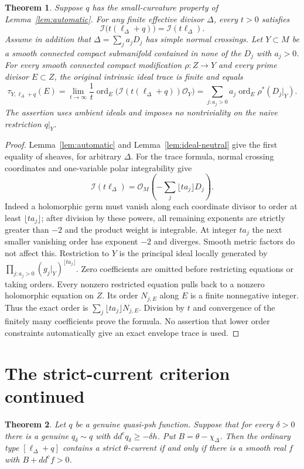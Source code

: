 \documentclass[11pt]{article}
\newtheorem{theorem}{Theorem}
\theoremstyle{remark}
\newcommand{\ddc}{dd^{\mathrm c}}
\begin{document}
\begin{theorem}\label{thm:intrinsic-trace}
Suppose $q$ has the small-curvature property of Lemma~\ref{lem:automatic}.
For any finite effective divisor $\Delta$, every $t>0$ satisfies
\[
 \mathcal I\bigl(t(\ell_\Delta+q)\bigr)
       =\mathcal I(t\ell_\Delta).
\]
Assume in addition that $\Delta=\sum_j a_jD_j$ has simple normal crossings.
Let $Y\subset M$ be a smooth connected compact submanifold contained in
none of the $D_j$ with $a_j>0$. For every smooth connected compact
modification $\rho:Z\to Y$ and every prime divisor $E\subset Z$, the
original intrinsic ideal trace is finite and equals
\[
 \tau_{Y,\ell_\Delta+q}(E)
 =\lim_{t\to\infty}\frac1t
   \operatorname{ord}_E\bigl(\mathcal I(t(\ell_\Delta+q))\mathcal O_Y\bigr)
 =\sum_{j:a_j>0} a_j\operatorname{ord}_E\rho^*(D_j|_Y).
\]
The assertion uses ambient ideals and imposes no nontriviality on the
naive restriction $q|_Y$.
\end{theorem}
\begin{proof}
Lemma~\ref{lem:automatic} and Lemma~\ref{lem:ideal-neutral} give the
first equality of sheaves, for arbitrary $\Delta$.
For the trace formula, normal crossing coordinates and one-variable
polar integrability give
\[
 \mathcal I(t\ell_\Delta)
       =\mathcal O_M\left(-\sum_j\lfloor t a_j\rfloor D_j\right).
\]
Indeed a holomorphic germ must vanish along each coordinate divisor to
order at least $\lfloor t a_j\rfloor$; after division by these powers,
all remaining exponents are strictly greater than $-2$ and the product
weight is integrable. At integer $t a_j$ the next smaller vanishing order
has exponent $-2$ and diverges. Smooth metric factors do not affect this.
Restriction to $Y$ is the principal ideal locally generated by
$\prod_{j:a_j>0}(g_j|_Y)^{\lfloor t a_j\rfloor}$. Zero coefficients
are omitted before restricting equations or taking orders. Every nonzero restricted
equation pulls back to a nonzero holomorphic equation on $Z$.
Its order $N_{j,E}$ along $E$ is a finite nonnegative integer.
Thus the exact order is $\sum_j\lfloor t a_j\rfloor N_{j,E}$.
Division by $t$ and convergence of the finitely many coefficients prove
the formula. No assertion that lower order constraints automatically
give an exact envelope trace is used.
\end{proof}

\section{The strict-current criterion continued}
\begin{theorem}\label{thm:criterion}
Let $q$ be a genuine quasi-psh function. Suppose that for every
$\delta>0$ there is a genuine $q_\delta\sim q$ with
$\ddc q_\delta\geq-\delta h$.
Put $B=\theta-\chi_\Delta$. Then the ordinary type
$[\ell_\Delta+q]$ contains a strict $\theta$-current if and only if
there is a smooth real $f$ with $B+\ddc f>0$.
\end{theorem}
\end{document}
